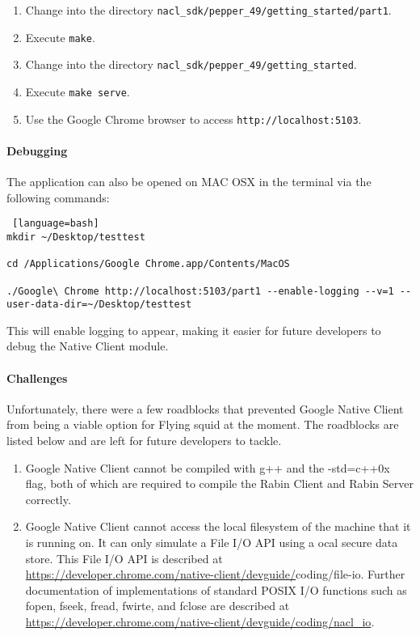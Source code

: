 \begin{appendices}
\begin{enumerate}
\item Change into the directory \verb|nacl_sdk/pepper_49/getting_started/part1|.

\item Execute \verb|make|.

\item Change into the directory \verb|nacl_sdk/pepper_49/getting_started|.

\item Execute \verb|make serve|.

\item Use the Google Chrome browser to access \verb|http://localhost:5103|. 

\end{enumerate}

\paragraph{Debugging}

The application can also be opened on MAC OSX in the terminal via the following commands:

\begin{lstlisting} [language=bash]
mkdir ~/Desktop/testtest

cd /Applications/Google Chrome.app/Contents/MacOS

./Google\ Chrome http://localhost:5103/part1 --enable-logging --v=1 --user-data-dir=~/Desktop/testtest
\end{lstlisting}

This will enable logging to appear, making it easier for future developers to debug the Native Client module.


\paragraph{Challenges}

Unfortunately, there were a few roadblocks that prevented Google Native Client from being a viable option for Flying squid at the moment. The roadblocks are listed below and are left for future developers to tackle.

\begin{enumerate}

\item Google Native Client cannot be compiled with g++ and the -std=c++0x flag, both of which are required to compile the Rabin Client and Rabin Server correctly. 

\item Google Native Client cannot access the local filesystem of the machine that it is running on. It can only simulate a File I/O API using a ocal secure data store. This File I/O API is described at  \url{https://developer.chrome.com/native-client/devguide/}coding/file-io. Further documentation of implementations of standard POSIX I/O functions such as fopen, fseek, fread, fwirte, and fclose are described at \url{https://developer.chrome.com/native-client/devguide/coding/nacl_io}.
\end{enumerate}

\end{appendices}